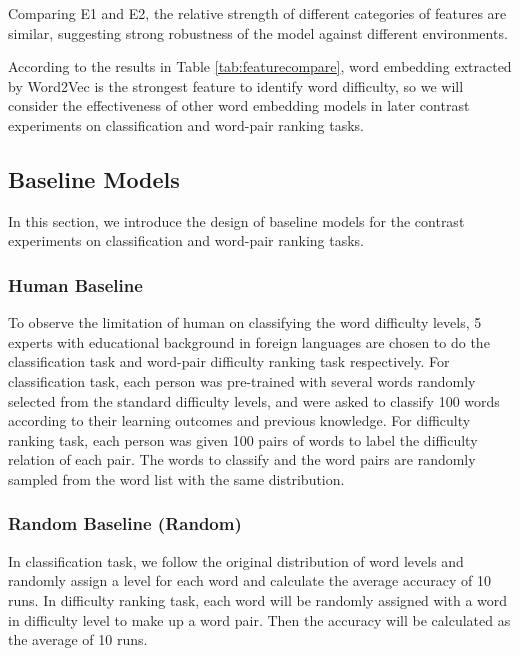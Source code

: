 Comparing E1 and E2, the relative strength of different categories of features are similar, suggesting strong robustness of the model against different environments.

According to the results in Table \ref{tab:featurecompare}, word embedding extracted by Word2Vec is the strongest feature to identify word difficulty, so we will consider the effectiveness of  other word embedding models in later contrast experiments on classification and word-pair ranking tasks.

\subsection{Baseline Models}
In this section, we introduce the design of baseline models for the contrast experiments on classification and word-pair ranking tasks.
\subsubsection{Human Baseline}
To observe the limitation of human on classifying the word difficulty levels, 5 experts with educational background in foreign languages are chosen to do the classification task and word-pair difficulty ranking task respectively.
For classification task, each person was pre-trained with several words randomly selected from the standard difficulty levels, and were asked to classify 100 words according to their learning outcomes and previous knowledge.
For difficulty ranking task, each person was given 100 pairs of words to label the difficulty relation of each pair. 
The words to classify and the word pairs are randomly sampled from the word list with the same distribution.



\subsubsection{Random Baseline (Random)}
In classification task, we follow the original distribution of word levels and randomly assign a level for each word and calculate the average accuracy of 10 runs.
In difficulty ranking task, each word will be randomly assigned with a word in difficulty level to make up a word pair.
Then the accuracy will be calculated as the average of 10 runs.

